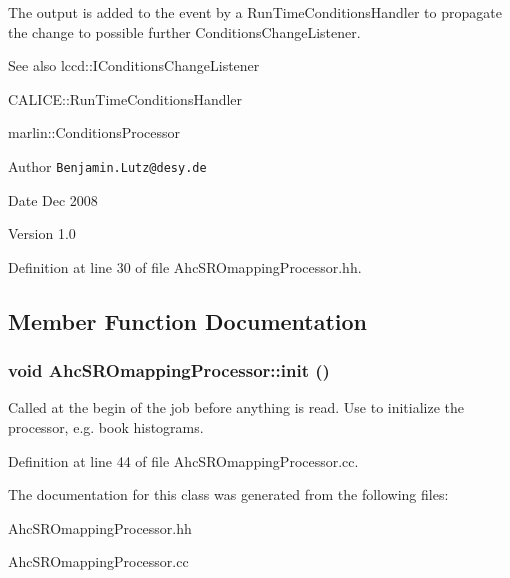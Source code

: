 The output is added to the event by a RunTimeConditionsHandler to propagate the change to possible further ConditionsChangeListener.

\begin{DoxySeeAlso}{See also}
lccd::IConditionsChangeListener 

CALICE::RunTimeConditionsHandler 

marlin::ConditionsProcessor
\end{DoxySeeAlso}
\begin{DoxyAuthor}{Author}
{\tt Benjamin.Lutz@desy.de} 
\end{DoxyAuthor}
\begin{DoxyDate}{Date}
Dec 2008 
\end{DoxyDate}
\begin{DoxyVersion}{Version}
1.0 
\end{DoxyVersion}


Definition at line 30 of file AhcSROmappingProcessor.hh.

\subsection{Member Function Documentation}
\subsubsection[{init}]{\setlength{\rightskip}{0pt plus 5cm}void AhcSROmappingProcessor::init ()\hspace{0.3cm}{\ttfamily  [virtual]}}\label{classAhcSROmappingProcessor_a4b86cdb371c629d8a5919c5ddedb60d5}


Called at the begin of the job before anything is read. Use to initialize the processor, e.g. book histograms. 

Definition at line 44 of file AhcSROmappingProcessor.cc.

The documentation for this class was generated from the following files:\begin{DoxyCompactItemize}
\item 
AhcSROmappingProcessor.hh\item 
AhcSROmappingProcessor.cc\end{DoxyCompactItemize}

